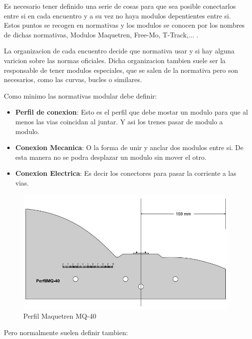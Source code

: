 Es necesario tener definido una serie de cosas para que sea posible conectarlos entre si en cada encuentro y a su vez no haya modulos depentientes entre si. Estos puntos se recogen en normativas y los modulos se conocen por los nombres de dichas normativas, Modulos Maquetren, Free-Mo, T-Track,... . 

La organizacion de cada encuentro decide que normativa usar y si hay alguna varicion sobre las normas oficiales. Dicha organizacion tambien suele ser la responsable de tener modulos especiales, que  se salen de la normativa pero son necesarios, como las curvas, bucles o similares.

Como minimo las normativas modular debe definir:
\begin{itemize}
	\item \textbf{Perfil de conexion}: Esto es el perfil que debe mostar un modulo para que al menos las vias coincidan al juntar. Y asi los trenes pasar de modulo a modulo.
	\item \textbf{Conexion Mecanica}: O la forma de unir y anclar dos modulos entre si. De esta manera no se podra desplazar un modulo sin mover el otro.
	\item \textbf{Conexion Electrica}: Es decir los conectores para pasar la corriente a las vias.
\end{itemize}

\begin{figure}[h]
	\centering\includegraphics[scale=0.5]{chapters/0X_Normativas_01_Intro/PERFILMQ40.jpg}
	\caption{Perfil Maquetren MQ-40}
	\label{fig:perfilmq40}
\end{figure}

Pero normalmente suelen definir tambien:

